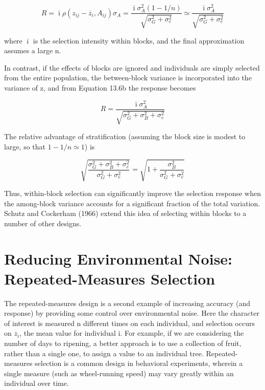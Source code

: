 \documentclass{article}
\begin{document}
\begin{equation}
R=\bar{\imath}\rho(z_{i j}-\overline{z}_{i},A_{i j})\sigma_{A}=\frac{\bar{\imath}\sigma_{A}^{2}(1-1/n)}{\sqrt{\sigma_{G}^{2}+\sigma_{e}^{2}}}\simeq\frac{\bar{\imath}\sigma_{A}^{2}}{\sqrt{\sigma_{G}^{2}+\sigma_{e}^{2}}}
\tag{13.14b}
\label{eq:13_14b}
\end{equation}

where  $ \bar{\imath} $ is the selection intensity within blocks, and the final approximation assumes a large n.

In contrast, if the effects of blocks are ignored and individuals are simply selected from the entire population, the between-block variance is incorporated into the variance of z, and from Equation 13.6b the response becomes

\begin{equation}
R=\frac{\bar{\imath}\sigma_{A}^{2}}{\sqrt{\sigma_{G}^{2}+\sigma_{B}^{2}+\sigma_{e}^{2}}}
\tag{13.14c}
\label{eq:13_14c}
\end{equation}

The relative advantage of stratification (assuming the block size is modest to large, so that  $ 1 - 1/n \simeq 1 $) is

\begin{equation}
\sqrt{\frac{\sigma_{G}^{2}+\sigma_{B}^{2}+\sigma_{e}^{2}}{\sigma_{G}^{2}+\sigma_{e}^{2}}}=\sqrt{1+\frac{\sigma_{B}^{2}}{\sigma_{G}^{2}+\sigma_{e}^{2}}}
\tag{13.15}
\label{eq:13_15}
\end{equation}

Thus, within-block selection can significantly improve the selection response when the among-block variance accounts for a significant fraction of the total variation. Schutz and Cockerham (1966) extend this idea of selecting within blocks to a number of other designs.

\section{Reducing Environmental Noise: Repeated-Measures Selection}
The repeated-measures design is a second example of increasing accuracy (and response) by providing some control over environmental noise. Here the character of interest is measured n different times on each individual, and selection occurs on  $ \overline{z}_{i} $, the mean value for individual i. For example, if we are considering the number of days to ripening, a better approach is to use a collection of fruit, rather than a single one, to assign a value to an individual tree. Repeated-measures selection is a common design in behavioral experiments, wherein a single measure (such as wheel-running speed) may vary greatly within an individual over time.
\end{document}
